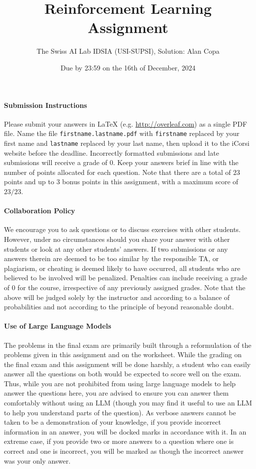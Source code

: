 \documentclass[a4paper,11pt]{article}
\author{The Swiss AI Lab IDSIA (USI-SUPSI), Solution: Alan Copa}
\title{Reinforcement Learning Assignment}
\date{Due by 23:59 on the 16th of December, 2024}
\begin{document}
\maketitle
\thispagestyle{fancy}

\paragraph{Submission Instructions}
Please submit your answers in {\LaTeX} (e.g. \url{http://overleaf.com}) as a single PDF file.
Name the file \texttt{firstname.lastname.pdf} with \texttt{firstname} replaced by your first name and \texttt{lastname} replaced by your last name, then upload it to the iCorsi website before the deadline.
Incorrectly formatted submissions and late submissions will receive a grade of $0$.
Keep your answers brief in line with the number of points allocated for each question.
Note that there are a total of $23$ points and up to $3$ bonus points in this assignment, with a maximum score of $23/23$.

\paragraph{Collaboration Policy}
We encourage you to ask questions or to discuss exercises with other students.
However, under no circumstances should you share your answer with other students or look at any other students' answers.
If two submissions or any answers therein are deemed to be too similar by the responsible TA, or plagiarism, or cheating is deemed likely to have occurred, all students who are believed to be involved will be penalized.
Penalties can include receiving a grade of $0$ for the course, irrespective of any previously assigned grades.
Note that the above will be judged solely by the instructor and according to a balance of probabilities and not according to the principle of beyond reasonable doubt.

\paragraph{Use of Large Language Models}
The problems in the final exam are primarily built through a reformulation of the problems given in this assignment and on the worksheet.
While the grading on the final exam and this assignment will be done harshly, a student who can easily answer all the questions on both would be expected to score well on the exam.
Thus, while you are not prohibited from using large language models to help answer the questions here, you are advised to ensure you can answer them comfortably without using an LLM (though you may find it useful to use an LLM to help you understand parts of the question).
As verbose answers cannot be taken to be a demonstration of your knowledge, if you provide incorrect information in an answer, you will be docked marks in accordance with it.
In an extreme case, if you provide two or more answers to a question where one is correct and one is incorrect, you will be marked as though the incorrect answer was your only answer.
\end{document}
